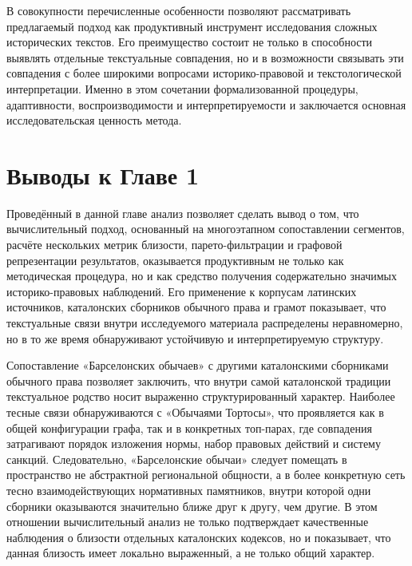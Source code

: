 В совокупности перечисленные особенности позволяют рассматривать предлагаемый подход как продуктивный инструмент исследования сложных исторических текстов. Его преимущество состоит не только в способности выявлять отдельные текстуальные совпадения, но и в возможности связывать эти совпадения с более широкими вопросами историко-правовой и текстологической интерпретации. Именно в этом сочетании формализованной процедуры, адаптивности, воспроизводимости и интерпретируемости и заключается основная исследовательская ценность метода.

\section*{Выводы к Главе 1}

Проведённый в данной главе анализ позволяет сделать вывод о том, что вычислительный подход, основанный на многоэтапном сопоставлении сегментов, расчёте нескольких метрик близости, парето-фильтрации и графовой репрезентации результатов, оказывается продуктивным не только как методическая процедура, но и как средство получения содержательно значимых историко-правовых наблюдений. Его применение к корпусам латинских источников, каталонских сборников обычного права и грамот показывает, что текстуальные связи внутри исследуемого материала распределены неравномерно, но в то же время обнаруживают устойчивую и интерпретируемую структуру.

Сопоставление «Барселонских обычаев» с другими каталонскими сборниками обычного права позволяет заключить, что внутри самой каталонской традиции текстуальное родство носит выраженно структурированный характер. Наиболее тесные связи обнаруживаются с «Обычаями Тортосы», что проявляется как в общей конфигурации графа, так и в конкретных топ-парах, где совпадения затрагивают порядок изложения нормы, набор правовых действий и систему санкций. Следовательно, «Барселонские обычаи» следует помещать в пространство не абстрактной региональной общности, а в более конкретную сеть тесно взаимодействующих нормативных памятников, внутри которой одни сборники оказываются значительно ближе друг к другу, чем другие. В этом отношении вычислительный анализ не только подтверждает качественные наблюдения о близости отдельных каталонских кодексов, но и показывает, что данная близость имеет локально выраженный, а не только общий характер.

